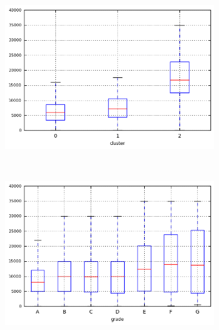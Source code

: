 \begin{anexosenv}
\begin{figure}[t!]
\begin{subfigure}[t]{0.45\textwidth}
            \centerline{\includegraphics[width=1.05\textwidth]{img/total_rec_prncp_by_cluster}}
        \end{subfigure}%
        ~ 
        \begin{subfigure}[t]{0.45\textwidth}
            \centering
   
            \centerline{\includegraphics[width=1.05\textwidth]{img/total_rec_prncp_by_grade}}

        \end{subfigure}
\end{figure}



\begin{figure}[t!]
    \centering
        \caption{\emph{Boxplots} de total\textunderscore rec\textunderscore late\textunderscore fee }
        \begin{subfigure}[t]{0.45\textwidth}
            \centering


\end{subfigure}
\end{figure}
\end{anexosenv}
